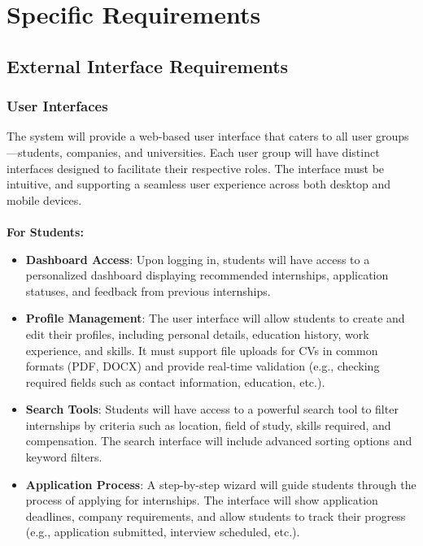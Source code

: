 \section{Specific Requirements}

\subsection{External Interface Requirements}

\subsubsection{User Interfaces}

The system will provide a web-based user interface that caters to all user groups—students, companies, and universities. Each user group will have distinct interfaces designed to facilitate their respective roles. The interface must be intuitive, and supporting a seamless user experience across both desktop and mobile devices. \\ \\
\vspace{5mm}
\textbf{For Students:}
\begin{itemize}
    \item \textbf{Dashboard Access}: Upon logging in, students will have access to a personalized dashboard displaying recommended internships, application statuses, and feedback from previous internships.
    \item \textbf{Profile Management}: The user interface will allow students to create and edit their profiles, including personal details, education history, work experience, and skills. It must support file uploads for CVs in common formats (PDF, DOCX) and provide real-time validation (e.g., checking required fields such as contact information, education, etc.).
    \item \textbf{Search Tools}: Students will have access to a powerful search tool to filter internships by criteria such as location, field of study, skills required, and compensation. The search interface will include advanced sorting options and keyword filters.
    \item \textbf{Application Process}: A step-by-step wizard will guide students through the process of applying for internships. The interface will show application deadlines, company requirements, and allow students to track their progress (e.g., application submitted, interview scheduled, etc.).
\end{itemize}
